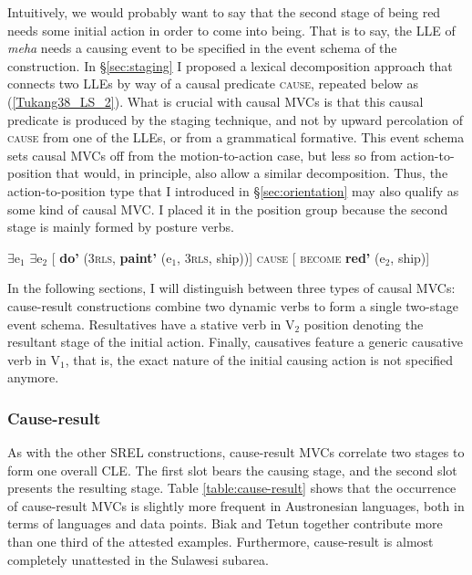 Intuitively, we would probably want to say that the second stage of being red needs some initial action in order to come into being. That is to say, the LLE of \textit{meha} needs a causing event to be specified in the event schema of the construction. In §\ref{sec:staging} I proposed a lexical decomposition approach that connects two LLEs by way of a causal predicate \textsc{cause}, repeated below as (\ref{Tukang38_LS_2}). What is crucial with causal MVCs is that this causal predicate is produced by the staging technique, and not by upward percolation of \textsc{cause} from one of the LLEs, or from a grammatical formative. This event schema sets causal MVCs off from the motion-to-action case, but less so from action-to-position that would, in principle, also allow a similar decomposition. Thus, the action-to-position type that I introduced in §\ref{sec:orientation} may also qualify as some kind of causal MVC. I placed it in the position group because the second stage is mainly formed by posture verbs.

\ea \label{Tukang38_LS_2} 
$\exists$e$_1$ $\exists$e$_2$ [ \textbf{do'} (3\textsc{rls}, \textbf{paint'} (e$_1$, 3\textsc{rls}, ship))] \textsc{cause} [ \textsc{become} \textbf{red'} (e$_2$, ship)]
\z

In the following sections, I will distinguish between three types of causal MVCs: cause-result constructions combine two dynamic verbs to form a single two-stage event schema. Resultatives have a stative verb in V$_2$ position denoting the resultant stage of the initial action. Finally, causatives feature a generic causative verb in V$_1$, that is, the exact nature of the initial causing action is not specified anymore.

\subsubsection{Cause-result} \label{sec:cause-result}

As with the other SREL constructions, cause-result MVCs correlate two stages to form one overall CLE. The first slot bears the causing stage, and the second slot presents the resulting stage. Table \ref{table:cause-result} shows that the occurrence of cause-result MVCs is slightly more frequent in Austronesian languages, both in terms of languages and data points. Biak and Tetun together contribute more than one third of the attested examples. Furthermore, cause-result is almost completely unattested in the Sulawesi subarea. 

